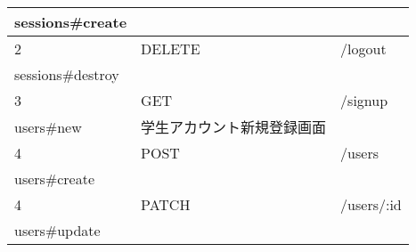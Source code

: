 \begin{table}[]
\begin{tabular}{lll}
\multicolumn{1}{|l|}{sessions\#create}             &                             &                                                                                                                                                             \\ \hline
\multicolumn{1}{|l|}{2}                            & \multicolumn{1}{l|}{DELETE} & \multicolumn{1}{l|}{/logout}                                                                                                                                \\ \hline
\multicolumn{1}{|l|}{sessions\#destroy}            &                             &                                                                                                                                                             \\ \hline
\multicolumn{1}{|l|}{3}                            & \multicolumn{1}{l|}{GET}    & \multicolumn{1}{l|}{/signup}                                                                                                                                \\ \hline
\multicolumn{1}{|l|}{users\#new}                   & 学生アカウント新規登録画面               &                                                                                                                                                             \\ \hline
\multicolumn{1}{|l|}{4}                            & \multicolumn{1}{l|}{POST}   & \multicolumn{1}{l|}{/users}                                                                                                                                 \\ \hline
\multicolumn{1}{|l|}{users\#create}                &                             &                                                                                                                                                             \\ \hline
\multicolumn{1}{|l|}{4}                            & \multicolumn{1}{l|}{PATCH}  & \multicolumn{1}{l|}{/users/:id}                                                                                                                             \\ \hline
\multicolumn{1}{|l|}{users\#update}                &                             &                                                                                                                                                             \\ \hline

\end{tabular}
\end{table}
